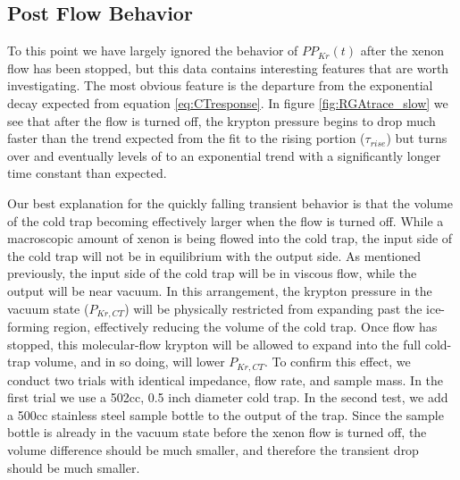 \documentclass[12pt]{article}
\begin{document}
\subsection{Post Flow Behavior}
To this point we have largely ignored the behavior of $PP_{Kr}(t)$ after the xenon flow has been stopped, but this data contains interesting features that are worth investigating. The most obvious feature is the departure from the exponential decay expected from equation \ref{eq:CTresponse}. In figure \ref{fig:RGAtrace_slow} we see that after the flow is turned off, the krypton pressure begins to drop much faster than the trend expected from the fit to the rising portion ($\tau_{rise}$) but turns over and eventually levels of to an exponential trend with a significantly longer time constant than expected. 

Our best explanation for the quickly falling transient behavior is that the volume of the cold trap becoming effectively larger when the flow is turned off. While a macroscopic amount of xenon is being flowed into the cold trap, the input side of the cold trap will not be in equilibrium with the output side. As mentioned previously, the input side of the cold trap will be in viscous flow, while the output will be near vacuum. In this arrangement, the krypton pressure in the vacuum state ($P_{Kr,CT}$) will be physically restricted from expanding past the ice-forming region, effectively reducing the volume of the cold trap. Once flow has stopped, this molecular-flow krypton will be allowed to expand into the full cold-trap volume, and in so doing, will lower $P_{Kr,CT}$. To confirm this effect, we conduct two trials with identical impedance, flow rate, and sample mass. In the first trial we use a 502cc, 0.5 inch diameter cold trap. In the second test, we add a 500cc stainless steel sample bottle to the output of the trap. Since the sample bottle is already in the vacuum state before the xenon flow is turned off, the volume difference should be much smaller, and therefore the transient drop should be much smaller. 
\end{document}
